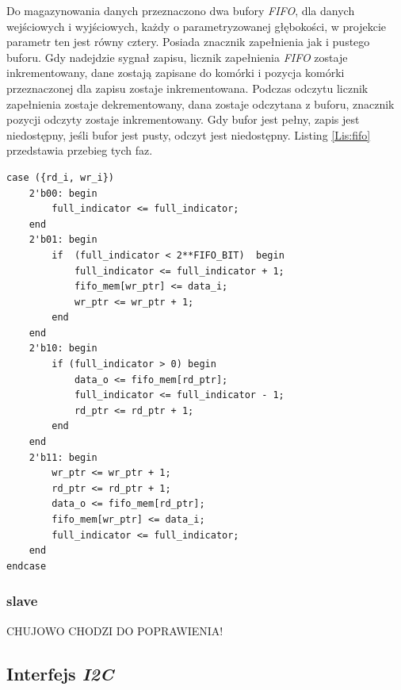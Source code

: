 \documentclass[11pt,a4paper]{article}
\begin{document}
Do magazynowania danych przeznaczono dwa bufory \textit{FIFO}, dla danych wejściowych i wyjściowych, każdy o parametryzowanej głębokości, w projekcie parametr ten jest równy cztery. Posiada znacznik zapełnienia jak i pustego buforu. Gdy nadejdzie sygnał zapisu, licznik zapełnienia \textit{FIFO} zostaje inkrementowany, dane zostają zapisane do komórki i pozycja komórki przeznaczonej dla zapisu zostaje inkrementowana. Podczas odczytu licznik zapełnienia zostaje dekrementowany, dana zostaje odczytana z buforu, znacznik pozycji odczyty zostaje inkrementowany. Gdy bufor jest pełny, zapis jest niedostępny, jeśli bufor jest pusty, odczyt jest niedostępny. Listing \ref{Lis:fifo} przedstawia przebieg tych faz.\\
 			 \begin{minipage}{\textwidth}
\begin{scriptsize}
\begin{lstlisting}[label=Lis:fifo,caption=Model \textit{FIFO}]
case ({rd_i, wr_i})
	2'b00: begin
		full_indicator <= full_indicator;
	end
	2'b01: begin
		if  (full_indicator < 2**FIFO_BIT)	begin
			full_indicator <= full_indicator + 1;
			fifo_mem[wr_ptr] <= data_i;
			wr_ptr <= wr_ptr + 1;
		end
	end
	2'b10: begin
		if (full_indicator > 0)	begin
			data_o <= fifo_mem[rd_ptr];
			full_indicator <= full_indicator - 1;
			rd_ptr <= rd_ptr + 1;
		end
	end
	2'b11: begin
		wr_ptr <= wr_ptr + 1;
		rd_ptr <= rd_ptr + 1;
		data_o <= fifo_mem[rd_ptr];
		fifo_mem[wr_ptr] <= data_i;
		full_indicator <= full_indicator;
	end
endcase
\end{lstlisting}
\end{scriptsize}
\end{minipage}
		\subsubsection{slave}
		
		\hspace{5mm} CHUJOWO CHODZI DO POPRAWIENIA!
			

	\subsection{Interfejs \textit{I2C}}
\end{document}
